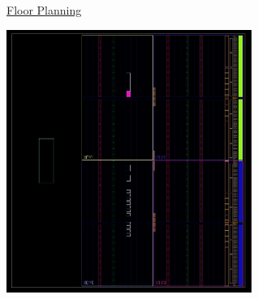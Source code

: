 \documentclass[11pt]{article}
\begin{document}
\begin{center}
    \underline{Floor Planning}

    \includegraphics[width = 0.6\textwidth]{floorplanning.jpg}


\end{center}
\end{document}
